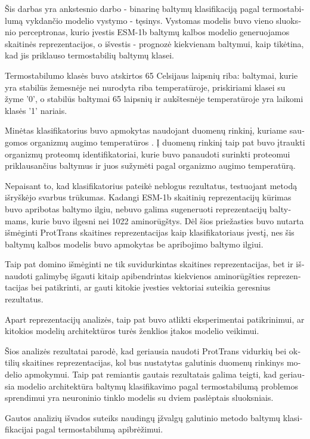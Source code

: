 \documentclass[12pt]{article}
\begin{document}
	\begin{otherlanguage}{lithuanian}
	
    Šis darbas yra ankstesnio darbo - binarinę baltymų klasifikaciją 
    pagal termostabilumą vykdančio modelio vystymo - tęsinys. Vystomas
    modelis buvo vieno sluoksnio perceptronas, kurio įvestis ESM-1b 
	\cite{rives2021biological}
    baltymų kalbos modelio generuojamos skaitinės reprezentacijos, o
    išvestis - prognozė kiekvienam baltymui, kaip tikėtina, kad jis 
    priklauso termostabilių baltymų klasei.
    
    Termostabilumo klasės buvo atskirtos 65 Celsijaus laipsnių riba:
    baltymai, kurie yra stabilūs žemesnėje nei nurodyta riba 
    temperatūroje, priskiriami klasei su žyme '0', o stabilūs 
    baltymai 65 laipsnių ir aukštesnėje temperatūroje yra 
    laikomi klasės '1' nariais.
    
    Minėtas klasifikatorius buvo apmokytas naudojant duomenų rinkinį, 
	kuriame
    saugomos organizmų augimo temperatūros 
	\cite{engqvist_martin_karl_magnus_2018_1175609}. Į duomenų rinkinį 
	taip pat
    buvo įtraukti organizmų proteomų identifikatoriai, kurie buvo
    panaudoti surinkti proteomui priklausančius baltymus ir juos 
    sužymėti pagal organizmo augimo temperatūrą.

    Nepaisant to, kad klasifikatorius pateikė neblogus rezultatus,
    testuojant metodą išryškėjo svarbus trūkumas. Kadangi ESM-1b
    skaitinių reprezentacijų kūrimas buvo apribotas baltymo ilgiu,
    nebuvo galima sugeneruoti reprezentacijų baltymams, kurie buvo 
    ilgesni nei 1022 aminorūgštys. Dėl šios priežasties buvo nutarta
    išmėginti ProtTrans \cite{elnaggar2020prottrans} skaitines 
	reprezentacijas kaip klasifikatoriaus
    įvestį, nes šis baltymų kalbos modelis buvo apmokytas be apribojimo 
    baltymo ilgiui. 

    Taip pat domino išmėginti ne tik suvidurkintas skaitines 
    reprezentacijas, bet ir išnaudoti galimybę išgauti kitaip
    apibendrintas kiekvienos aminorūgšties reprezentacijas bei 
    patikrinti, ar gauti kitokie įvesties vektoriai suteikia
    geresnius rezultatus. 
  
    Apart reprezentacijų analizės, taip pat buvo atlikti 
	eksperimentai
    patikrinimui, ar kitokios modelių architektūros turės
    ženklios įtakos modelio veikimui.

	Šios analizės rezultatai parodė, kad geriausia naudoti ProtTrans
	vidurkių bei oktilių skaitines reprezentacijas, kol bus nustatytas 
	galutinis duomenų rinkinys modelio apmokymui. Taip pat remiantis
	gautais rezultatais galima teigti, kad geriausia modelio 
	architektūra baltymų klasifikavimo pagal termostabilumą problemos
	sprendimui yra neuroninio tinklo modelis su dviem paslėptais
	sluoksniais.
      
    Gautos analizių išvados suteiks naudingų įžvalgų galutinio
    metodo baltymų klasifikacijai pagal termostabilumą apibrėžimui.

	\end{otherlanguage}
	
\end{document}
